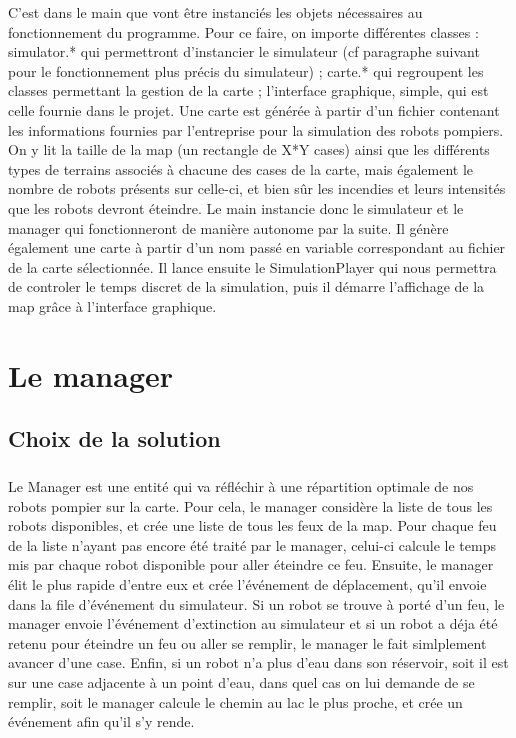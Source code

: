 \documentclass[10pt]{report}
\begin{document}
C'est dans le main que vont être instanciés les objets nécessaires au fonctionnement du programme. Pour ce faire, on importe différentes classes : simulator.* qui permettront d'instancier le simulateur (cf paragraphe suivant pour le fonctionnement plus précis du simulateur) ; carte.* qui regroupent les classes permettant la gestion de la carte ; l'interface graphique, simple, qui est celle fournie dans le projet.
Une carte est générée à partir d'un fichier contenant les informations fournies par l'entreprise pour la simulation des robots pompiers. On y lit la taille de la map (un rectangle de X*Y cases) ainsi que les différents types de terrains associés à chacune des cases de la carte, mais également le nombre de robots présents sur celle-ci, et bien sûr les incendies et leurs intensités que les robots devront éteindre.
Le main instancie donc le simulateur et le manager qui fonctionneront de manière autonome par la suite. Il génère également une carte à partir d'un nom passé en variable correspondant au fichier de la carte sélectionnée. Il lance ensuite le SimulationPlayer qui nous permettra de controler le temps discret de la simulation, puis il démarre l'affichage de la map grâce à l'interface graphique. 
\chapter{Le manager}
\section{Choix de la solution}
\paragraph{}Le Manager est une entité qui va réfléchir à une répartition optimale de nos robots pompier sur la carte. Pour cela, le manager considère la liste de tous les robots disponibles, et crée une liste de tous les feux de la map. Pour chaque feu de la liste n'ayant pas encore été traité par le manager, celui-ci calcule le temps mis par chaque robot disponible pour aller éteindre ce feu. Ensuite, le manager élit le plus rapide d'entre eux et crée l'événement de déplacement, qu'il envoie dans la file d'événement du simulateur. Si un robot se trouve à porté d'un feu, le manager envoie l'événement d'extinction au simulateur et si un robot a déja été retenu pour éteindre un feu ou aller se remplir, le manager le fait simlplement avancer d'une case. Enfin, si un robot n'a plus d'eau dans son réservoir, soit il est sur une case adjacente à un point d'eau, dans quel cas on lui demande de se remplir, soit le manager calcule le chemin au lac le plus proche, et crée un événement afin qu'il s'y rende.
\end{document}
